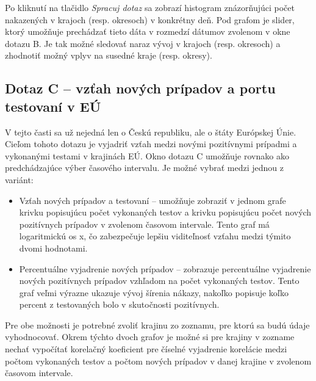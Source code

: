 \documentclass [11pt, a4paper]{article}
\begin{document}
Po kliknutí na tlačidlo \textit{Spracuj dotaz} sa zobrazí histogram znázorňujúci počet nakazených v krajoch (resp. okresoch) v konkrétny deň. Pod grafom je slider, ktorý umožňuje prechádzať tieto dáta v rozmedzí dátumov zvolenom v okne dotazu B. Je tak možné sledovať naraz vývoj v krajoch (resp. okresoch) a zhodnotiť možný vplyv na susedné kraje (resp. okresy).

\subsection*{Dotaz C -- vzťah nových prípadov a portu testovaní v EÚ}
V tejto časti sa už nejedná len o Českú republiku, ale o štáty Európskej Únie. Cieľom tohoto dotazu je vyjadriť vzťah medzi novými pozitívnymi prípadmi a vykonanými testami v krajinách EÚ. 
Okno dotazu C umožňuje rovnako ako predchádzajúce výber časového intervalu. Je možné vybrať medzi jednou z variánt:
\begin{itemize}
    \item Vzťah nových prípadov a testovaní -- umožňuje zobraziť v jednom grafe krivku popisujúcu počet vykonaných testov a krivku popisujúcu počet nových pozitívnych prípadov v zvolenom časovom intervale. Tento graf má logaritmickú os x, čo zabezpečuje lepšiu viditeľnosť vzťahu medzi týmito dvomi hodnotami.
    \item Percentuálne vyjadrenie nových prípadov -- zobrazuje percentuálne vyjadrenie nových pozitívnych prípadov vzhľadom na počet vykonaných testov. Tento graf veľmi výrazne ukazuje vývoj šírenia nákazy, nakoľko popisuje koľko percent z testovaných bolo v skutočnosti pozitívnych.
\end{itemize}

Pre obe možnosti je potrebné zvoliť krajinu zo zoznamu, pre ktorú sa budú údaje vyhodnocovať. Okrem týchto dvoch grafov je možné si pre krajiny v zozname nechať vypočítať korelačný koeficient pre číselné vyjadrenie korelácie medzi počtom vykonaných testov a počtom nových prípadov v danej krajine v zvolenom časovom intervale.
\end{document}
